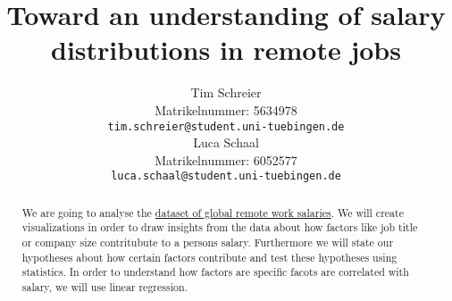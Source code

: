 \documentclass{article}
\title{Toward an understanding of salary distributions in remote jobs}
\author{%
  Tim Schreier\\
  Matrikelnummer: 5634978\\
  \texttt{tim.schreier@student.uni-tuebingen.de} \\
  \And
  Luca Schaal\\
  Matrikelnummer: 6052577\\
  \texttt{luca.schaal@student.uni-tuebingen.de} \\
}
\begin{document}
\maketitle

\begin{abstract}We are going to analyse the \href{https://salaries.freshremote.work/download/}{dataset of global remote work salaries}.
We will create visualizations in order to draw insights from the data about how factors like job title or company size contritubute to a persons salary.
Furthermore we will state our hypotheses about how certain factors contribute and test these hypotheses using statistics.
In order to understand how factors are specific facots are correlated with salary, we will use linear regression.
\end{abstract}
\end{document}
